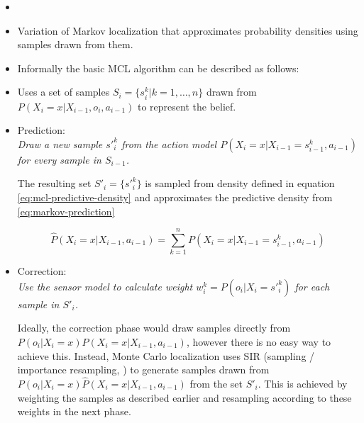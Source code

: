 \begin{itemize}
\item\cite{dellaert99}
\item Variation of Markov localization that approximates probability densities using
	samples drawn from them.
\item Informally the basic MCL algorithm can be described as follows:

\item Uses a set of samples \(S_i = \{s^k_{i} | k = 1,\dotsc,n\} \) drawn from
	\(P(X_i = x | X_{i-1}, o_i, a_{i - 1})\) to represent the belief.

\item Prediction:\\
	\emph{
	Draw a new sample \(s'^k_{i}\)
	from the action model \(P(X_i = x | X_{i-1} = s^k_{i-1}, a_{i - 1})\)
	for every sample in \(S_{i-1}\).
	}

	The resulting set \(S'_i = \{s'^k_{i}\} \) is sampled from
	density defined in equation \eqref{eq:mcl-predictive-density} and approximates the predictive
	density from \eqref{eq:markov-prediction}
	
	\begin{equation}
		\label{eq:mcl-predictive-density}
		\hat{P}(X_i = x | X_{i - 1}, a_{i - 1}) =
		\sum_{k = 1}^n P(X_i = x | X_{i-1} = s^k_{i-1}, a_{i - 1})
	\end{equation}

\item Correction:\\
	\emph{
	Use the sensor model to calculate weight \(w^k_i = P(o_i | X_i = s'^k_i)\)
	for each sample in \(S'_i\).
	}

	Ideally, the correction phase would draw samples directly from
	\(P(o_i | X_i = x) P(X_i = x | X_{i - 1}, a_{i - 1})\),
	however there is no easy way to achieve this.
	Instead, Monte Carlo localization 
	uses SIR (sampling / importance resampling, \cite{smith92})
	to generate samples drawn from
	\(P(o_i | X_i = x) \hat{P}(X_i = x | X_{i - 1}, a_{i - 1})\) from the set \(S'_i\).
	This is achieved by weighting the samples as described earlier and resampling
	according to these weights in the next phase.


\end{itemize}

